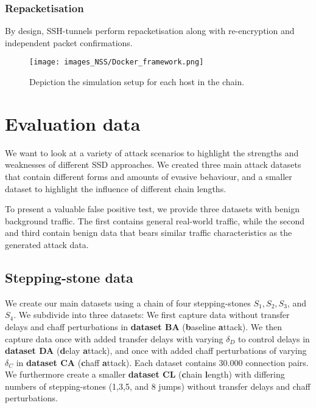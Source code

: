 \vspace{-0.6cm}
\subsubsection{Repacketisation}

By design, SSH-tunnels perform repacketisation along with re-encryption and independent packet confirmations.


\begin{figure}
\centering
\texttt{[image: images\_NSS/Docker\_framework.png]}
\caption{Depiction the simulation setup for each host in the chain.}\label{figN:Simulation_setup}
\vspace{-0.6cm}
\end{figure}

\section{Evaluation data}\label{SecN:Evaldata}


We want to look at a variety of attack scenarios to highlight the strengths and weaknesses of different SSD approaches. We created three main attack datasets that contain different forms and amounts of evasive behaviour, and a smaller dataset to highlight the influence of different chain lengths. 

To present a valuable false positive test, we provide three datasets with benign background traffic. The first contains general real-world traffic, while the second and third contain benign data that bears similar traffic characteristics as the generated attack data. 
\subsection{Stepping-stone data}
 
We create our main datasets using a chain of four stepping-stones $S_1, S_2, S_3$, and $S_4$. We subdivide into three datasets: We first capture data without transfer delays and chaff perturbations in \textbf{dataset BA} (\textbf{b}aseline \textbf{a}ttack). We then capture data once with added transfer delays with varying $\delta_D$ to control delays in \textbf{dataset DA} (\textbf{d}elay \textbf{a}ttack), and once with added chaff perturbations of varying $\delta_C$ in \textbf{dataset CA} (\textbf{c}haff \textbf{a}ttack). Each dataset contains 30.000 connection pairs.
We furthermore create a smaller \textbf{dataset CL} (\textbf{c}hain \textbf{l}ength) with differing numbers of stepping-stones (1,3,5, and 8 jumps) without transfer delays and chaff perturbations.

